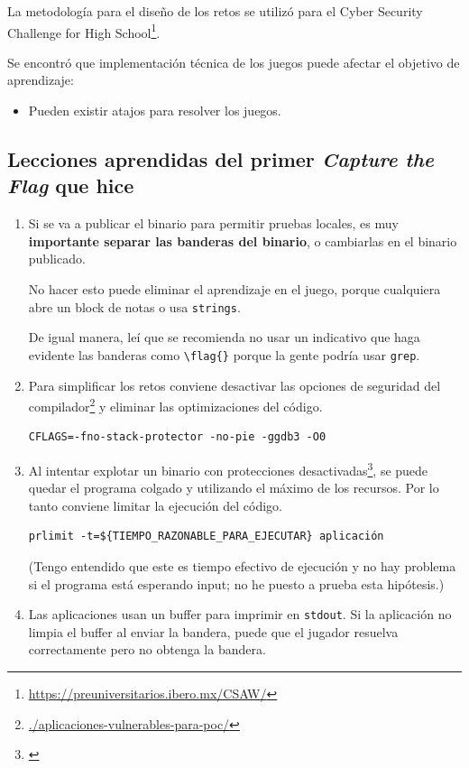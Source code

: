\documentclass[
  12,
]{scrartcl}
\DeclareRobustCommand{\href}[2]{#2\footnote{\url{#1}}}
\providecommand{\tightlist}{%
  \setlength{\itemsep}{0pt}\setlength{\parskip}{0pt}}
\begin{document}
La metodología para el diseño de los retos se utilizó para el
\href{https://preuniversitarios.ibero.mx/CSAW/}{Cyber Security Challenge
for High School}.

Se encontró que implementación técnica de los juegos puede afectar el
objetivo de aprendizaje:

\begin{itemize}
\tightlist
\item
  Pueden existir atajos para resolver los juegos.
\end{itemize}

\hypertarget{lecciones-aprendidas-del-primer-capture-the-flag-que-hice}{%
\subsection{\texorpdfstring{Lecciones aprendidas del primer
\emph{Capture the Flag} que
hice}{Lecciones aprendidas del primer Capture the Flag que hice}}\label{lecciones-aprendidas-del-primer-capture-the-flag-que-hice}}

\begin{enumerate}
\def\labelenumi{\arabic{enumi}.}
\item
  Si se va a publicar el binario para permitir pruebas locales, es muy
  \textbf{importante separar las banderas del binario}, o cambiarlas en
  el binario publicado.

  No hacer esto puede eliminar el aprendizaje en el juego, porque
  cualquiera abre un block de notas o usa \texttt{strings}.

  De igual manera, leí que se recomienda no usar un indicativo que haga
  evidente las banderas como \texttt{\textbackslash{}flag\{\}} porque la
  gente podría usar \texttt{grep}.
\item
  Para simplificar los retos conviene
  \href{./aplicaciones-vulnerables-para-poc/}{desactivar las opciones de
  seguridad del compilador} y eliminar las optimizaciones del código.

\begin{verbatim}
CFLAGS=-fno-stack-protector -no-pie -ggdb3 -O0
\end{verbatim}
\item
  Al intentar explotar \href{}{un binario con protecciones
  desactivadas}, se puede quedar el programa colgado y utilizando el
  máximo de los recursos. Por lo tanto conviene limitar la ejecución del
  código.

\begin{verbatim}
prlimit -t=${TIEMPO_RAZONABLE_PARA_EJECUTAR} aplicación
\end{verbatim}

  (Tengo entendido que este es tiempo efectivo de ejecución y no hay
  problema si el programa está esperando input; no he puesto a prueba
  esta hipótesis.)
\item
  Las aplicaciones usan un buffer para imprimir en \texttt{stdout}. Si
  la aplicación no limpia el buffer al enviar la bandera, puede que el
  jugador resuelva correctamente pero no obtenga la bandera.
\end{enumerate}
\end{document}
